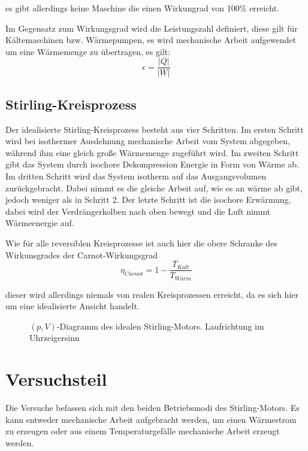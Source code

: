 es gibt allerdings keine Maschine die einen Wirkungrad von 100\% erreicht.

Im Gegensatz zum Wirkungsgrad wird die Leistungszahl definiert, diese
gilt für Kältemaschinen bzw. Wärmepumpen, es wird mechanische Arbeit
aufgewendet um eine Wärmemenge zu übertragen, es gilt:
\begin{equation}
\epsilon=\frac{|Q|}{|W|}\label{eq:Leistungszahl}
\end{equation}



\subsection{Stirling-Kreisprozess}

Der idealisierte Stirling-Kreisprozess besteht aus vier Schritten.
Im ersten Schritt wird bei isothermer Ausdehnung mechanische Arbeit
vom System abgegeben, während ihm eine gleich große Wärmemenge zugeführt
wird. Im zweiten Schritt gibt das System durch isochore Dekompression
Energie in Form von Wärme ab. Im dritten Schritt wird das System isotherm
auf das Ausgangsvolumen zurückgebracht. Dabei nimmt es die gleiche
Arbeit auf, wie es an wärme ab gibt, jedoch weniger als in Schritt
2. Der letzte Schritt ist die isochore Erwärmung, dabei wird der Verdrängerkolben
nach oben bewegt und die Luft nimmt Wärmeenergie auf.

Wie für alle reversiblen Kreisprozesse ist auch hier die obere Schranke
des Wirkunsgrades der Carnot-Wirkungsgrad 
\begin{equation}
\eta_{Carnot}=1-\frac{T_{Kalt}}{T_{Warm}}\label{eq:Carnot}
\end{equation}


dieser wird allerdings niemals von realen Kreisprozessen erreicht,
da es sich hier um eine idealisierte Ansicht handelt.

\begin{figure}[h!]
\centering
	
	\caption{$ (p,V) $-Diagramm des idealen Stirling-Motors. Laufrichtung im Uhrzeigersinn}
\end{figure}

\newpage
\section{Versuchsteil}

Die Versuche befassen sich mit den beiden Betriebsmodi des Stirling-Motors. Es kann entweder mechanische Arbeit aufgebracht werden, um einen Wärmestrom zu erzeugen oder aus einem Temperaturgefälle mechanische Arbeit erzeugt werden. 


